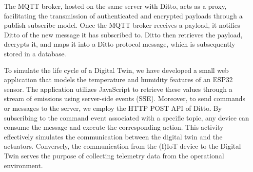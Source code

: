 The MQTT broker, hosted on the same server with Ditto, acts as a proxy, facilitating the transmission of authenticated and encrypted payloads through a publish-subscribe model. Once the MQTT broker receives a payload, it  notifies Ditto of the new message it has subscribed to. Ditto then retrieves the payload, decrypts it, and maps it into a Ditto protocol message, which is subsequently stored in a database.

To simulate the life cycle of a Digital Twin, we have developed a small web application that models the temperature and humidity features of an ESP32 sensor. The application utilizes JavaScript to retrieve these values through a stream of emissions using server-side events (SSE). Moreover, to send commands or messages to the server, we employ the HTTP POST API of Ditto. By subscribing to the command event associated with a specific topic, any device can consume the message and execute the corresponding action. This activity effectively simulates the communication between the digital twin and the actuators. Conversely, the communication from the (I)IoT device to the Digital Twin serves the purpose of collecting telemetry data from the operational environment.

